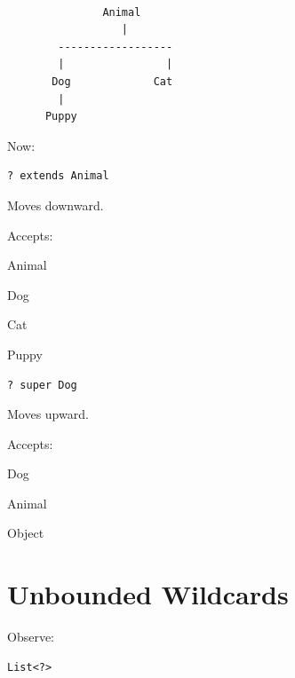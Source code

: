 \documentclass[11pt,a4paper]{book}
\begin{document}
\begin{verbatim}

               Animal
                  |
        ------------------
        |                |
       Dog             Cat
        |
      Puppy

\end{verbatim}


Now:

\begin{verbatim} 
? extends Animal
\end{verbatim}


Moves downward.


Accepts:


Animal

Dog

Cat

Puppy


\begin{verbatim} 
? super Dog
\end{verbatim}


Moves upward.


Accepts:


Dog

Animal

Object


\section{Unbounded Wildcards}

Observe:

\begin{verbatim} 
List<?>
\end{verbatim}
\end{document}
